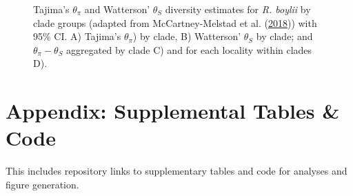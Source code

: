 \documentclass[proquest,12pt,final]{ucthesis-CA2012} %
\begin{document}
\begin{ucmainmatter}
\begin{figure}
{}

\caption{Tajima's \(\theta_\pi\) and Watterson' \(\theta_S\)
diversity estimates for \emph{R. boylii} by clade groups (adapted from
McCartney-Melstad et al.
(\protect\hyperlink{ref-mccartney-melstad_population_2018}{2018})) with
95\% CI. A) Tajima's \(\theta_\pi\)) by clade, B) Watterson'
\(\theta_S\) by clade; and \(\theta_\pi - \theta_S\) aggregated by clade
C) and for each locality within clades D).}\label{fig:CH3F6thetas}
\end{figure}
\clearpage

\appendix

\hypertarget{appendix-supplemental-tables-code}{%
\chapter{Appendix: Supplemental Tables \&
Code}\label{appendix-supplemental-tables-code}}

This includes repository links to supplementary tables and code for
analyses and figure generation.

\hypertarget{supptables}{%
}
\end{ucmainmatter}
\end{document}
